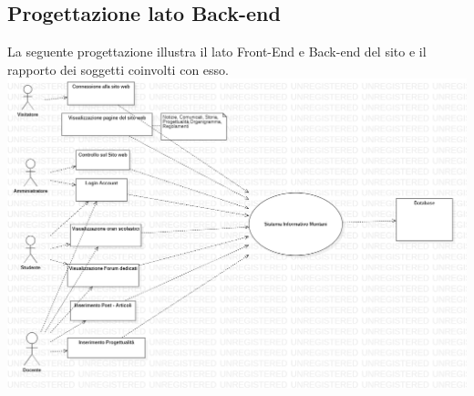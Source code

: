 \documentclass{article}
\begin{document}
	
	\subsection{\textbf{Progettazione lato Back-end}}
	La seguente progettazione illustra il lato Front-End e Back-end del sito e il rapporto dei soggetti coinvolti con esso.	
	\includegraphics[scale=0.35]{UseCaseDiagram.png}
\end{document}
